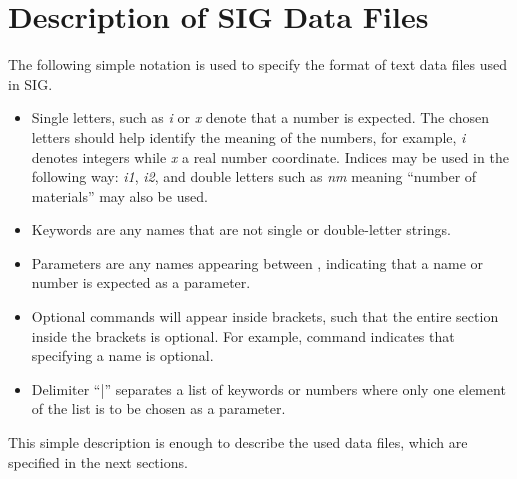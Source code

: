 
\section{Description of SIG Data Files}

The following simple notation is used to specify the format of text data files used in SIG.

\begin{itemize}
	\item Single letters, such as \emph{i} or \emph{x} denote that a number is expected. The chosen letters should help identify the meaning of the numbers, for example, \emph{i} denotes integers while \emph{x} a real number coordinate. Indices may be used in the following way: \emph{i1}, \emph{i2}, and double letters such as \emph{nm} meaning ``number of materials'' may also be used.
  
  \item Keywords are any names that are not single or double-letter strings.

  \item Parameters are any names appearing between {\ttfamily < >}, indicating that a name or number is expected as a parameter.
  
  \item Optional commands will appear inside brackets, such that the entire section inside the brackets is optional. For example, command {} indicates that specifying a name is optional.

  \item Delimiter ``{\ttfamily|}'' separates a list of keywords or numbers where only one element of the list is to be chosen as a parameter.

\end{itemize}

This simple description is enough to describe the used data files, which are specified in the next sections.


\captionsetup{labelformat=empty,labelsep=none}

\lstset{language=} %




